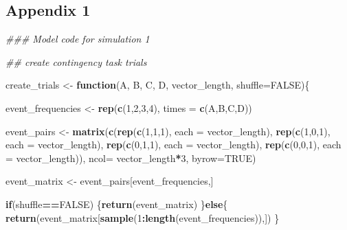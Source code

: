 \documentclass[
  english,
  man,floatsintext]{apa6}
\newenvironment{Shaded}{\begin{snugshade}}{\end{snugshade}}
\newcommand{\KeywordTok}[1]{\textcolor[rgb]{0.13,0.29,0.53}{\textbf{#1}}}
\newcommand{\DataTypeTok}[1]{\textcolor[rgb]{0.13,0.29,0.53}{#1}}
\newcommand{\DecValTok}[1]{\textcolor[rgb]{0.00,0.00,0.81}{#1}}
\newcommand{\StringTok}[1]{\textcolor[rgb]{0.31,0.60,0.02}{#1}}
\newcommand{\CommentTok}[1]{\textcolor[rgb]{0.56,0.35,0.01}{\textit{#1}}}
\newcommand{\OtherTok}[1]{\textcolor[rgb]{0.56,0.35,0.01}{#1}}
\newcommand{\ControlFlowTok}[1]{\textcolor[rgb]{0.13,0.29,0.53}{\textbf{#1}}}
\newcommand{\OperatorTok}[1]{\textcolor[rgb]{0.81,0.36,0.00}{\textbf{#1}}}
\newcommand{\NormalTok}[1]{#1}
\begin{document}
\begin{appendix}
\hypertarget{appendix-1}{%
\section{Appendix 1}\label{appendix-1}}

\begin{Shaded}
\begin{Highlighting}[]
\CommentTok{### Model code for simulation 1}

\CommentTok{## create contingency task trials}

\NormalTok{create_trials <-}\StringTok{ }\ControlFlowTok{function}\NormalTok{(A, B, C, D, vector_length, }\DataTypeTok{shuffle=}\OtherTok{FALSE}\NormalTok{)\{}

\NormalTok{  event_frequencies <-}\StringTok{ }\KeywordTok{rep}\NormalTok{(}\KeywordTok{c}\NormalTok{(}\DecValTok{1}\NormalTok{,}\DecValTok{2}\NormalTok{,}\DecValTok{3}\NormalTok{,}\DecValTok{4}\NormalTok{), }\DataTypeTok{times =} \KeywordTok{c}\NormalTok{(A,B,C,D))}

\NormalTok{  event_pairs <-}\StringTok{ }\KeywordTok{matrix}\NormalTok{(}\KeywordTok{c}\NormalTok{(}\KeywordTok{rep}\NormalTok{(}\KeywordTok{c}\NormalTok{(}\DecValTok{1}\NormalTok{,}\DecValTok{1}\NormalTok{,}\DecValTok{1}\NormalTok{), }\DataTypeTok{each =}\NormalTok{ vector_length),}
\KeywordTok{rep}\NormalTok{(}\KeywordTok{c}\NormalTok{(}\DecValTok{1}\NormalTok{,}\DecValTok{0}\NormalTok{,}\DecValTok{1}\NormalTok{), }\DataTypeTok{each =}\NormalTok{ vector_length),}
\KeywordTok{rep}\NormalTok{(}\KeywordTok{c}\NormalTok{(}\DecValTok{0}\NormalTok{,}\DecValTok{1}\NormalTok{,}\DecValTok{1}\NormalTok{), }\DataTypeTok{each =}\NormalTok{ vector_length),}
\KeywordTok{rep}\NormalTok{(}\KeywordTok{c}\NormalTok{(}\DecValTok{0}\NormalTok{,}\DecValTok{0}\NormalTok{,}\DecValTok{1}\NormalTok{), }\DataTypeTok{each =}\NormalTok{ vector_length)),}
\DataTypeTok{ncol=}\NormalTok{ vector_length}\OperatorTok{*}\DecValTok{3}\NormalTok{,}
\DataTypeTok{byrow=}\OtherTok{TRUE}\NormalTok{)}

\NormalTok{  event_matrix <-}\StringTok{ }\NormalTok{event_pairs[event_frequencies,]}

\ControlFlowTok{if}\NormalTok{(shuffle}\OperatorTok{==}\OtherTok{FALSE}\NormalTok{) \{}\KeywordTok{return}\NormalTok{(event_matrix)}
\NormalTok{    \}}\ControlFlowTok{else}\NormalTok{\{}
\KeywordTok{return}\NormalTok{(event_matrix[}\KeywordTok{sample}\NormalTok{(}\DecValTok{1}\OperatorTok{:}\KeywordTok{length}\NormalTok{(event_frequencies)),])}
\NormalTok{    \}}


\end{Highlighting}
\end{Shaded}
\end{appendix}
\end{document}
